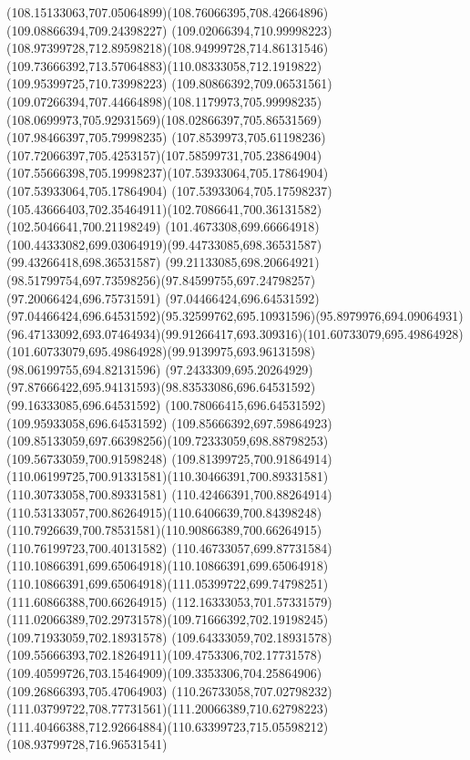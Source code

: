 {{		\curveto(108.15133063,707.05064899)(108.76066395,708.42664896)(109.08866394,709.24398227)
		\curveto(109.02066394,710.99998223)(108.97399728,712.89598218)(108.94999728,714.86131546)
		\curveto(109.73666392,713.57064883)(110.08333058,712.1919822)(109.95399725,710.73998223)
		\curveto(109.80866392,709.06531561)(109.07266394,707.44664898)(108.1179973,705.99998235)
		\curveto(108.0699973,705.92931569)(108.02866397,705.86531569)(107.98466397,705.79998235)
		\curveto(107.8539973,705.61198236)(107.72066397,705.4253157)(107.58599731,705.23864904)
		\curveto(107.55666398,705.19998237)(107.53933064,705.17864904)(107.53933064,705.17864904)
		\lineto(107.53933064,705.17598237)
		\curveto(105.43666403,702.35464911)(102.7086641,700.36131582)(102.5046641,700.21198249)
		\curveto(101.4673308,699.66664918)(100.44333082,699.03064919)(99.44733085,698.36531587)
		\lineto(99.43266418,698.36531587)
		\lineto(99.21133085,698.20664921)
		\curveto(98.51799754,697.73598256)(97.84599755,697.24798257)(97.20066424,696.75731591)
		\lineto(97.04466424,696.64531592)
		\curveto(97.04466424,696.64531592)(95.32599762,695.10931596)(95.8979976,694.09064931)
		\curveto(96.47133092,693.07464934)(99.91266417,693.309316)(101.60733079,695.49864928)
		\curveto(101.60733079,695.49864928)(99.9139975,693.96131598)(98.06199755,694.82131596)
		\curveto(97.2433309,695.20264929)(97.87666422,695.94131593)(98.83533086,696.64531592)
		\lineto(99.16333085,696.64531592)
		\lineto(100.78066415,696.64531592)
		\lineto(109.95933058,696.64531592)
		\lineto(109.85666392,697.59864923)
		\curveto(109.85133059,697.66398256)(109.72333059,698.88798253)(109.56733059,700.91598248)
		\curveto(109.81399725,700.91864914)(110.06199725,700.91331581)(110.30466391,700.89331581)
		\lineto(110.30733058,700.89331581)
		\curveto(110.42466391,700.88264914)(110.53133057,700.86264915)(110.6406639,700.84398248)
		\curveto(110.7926639,700.78531581)(110.90866389,700.66264915)(110.76199723,700.40131582)
		\curveto(110.46733057,699.87731584)(110.10866391,699.65064918)(110.10866391,699.65064918)
		\curveto(110.10866391,699.65064918)(111.05399722,699.74798251)(111.60866388,700.66264915)
		\curveto(112.16333053,701.57331579)(111.02066389,702.29731578)(109.71666392,702.19198245)
		\lineto(109.71933059,702.18931578)
		\curveto(109.64333059,702.18931578)(109.55666393,702.18264911)(109.4753306,702.17731578)
		\curveto(109.40599726,703.15464909)(109.3353306,704.25864906)(109.26866393,705.47064903)
		\curveto(110.26733058,707.02798232)(111.03799722,708.77731561)(111.20066389,710.62798223)
		\curveto(111.40466388,712.92664884)(110.63399723,715.05598212)(108.93799728,716.96531541)
}}
